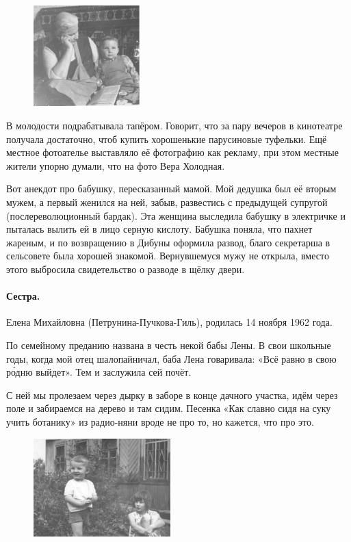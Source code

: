 \documentclass{book}
\begin{document}
\begin{figure}
\vskip-4mm
\centering
\includegraphics[width=41mm,angle=0]{pics/baba-lyusya-tosha}
\end{figure}

В молодости подрабатывала тапёром.
Говорит, что за пару вечеров в кинотеатре получала достаточно, чтоб купить хорошенькие парусиновые туфельки.
Ещё местное фотоателье выставляло её фотографию как рекламу, при этом местные жители упорно думали, что на фото Вера Холодная.

Вот анекдот про бабушку, пересказанный мамой.
Мой дедушка был её вторым мужем, а первый женился на ней, забыв, развестись с предыдущей супругой (послереволюционный бардак).
Эта женщина выследила бабушку в электричке и пыталась вылить ей в лицо серную кислоту.
Бабушка поняла, что пахнет жареным, и по возвращению в Дибуны оформила развод, благо секретарша в сельсовете была хорошей знакомой.
Вернувшемуся мужу не открыла, вместо этого выбросила свидетельство о разводе в щёлку двери.

\paragraph{Сестра.} Елена Михайловна (Петрунина-Пучкова-Гиль), родилась 14 ноября 1962 года.

По семейному преданию названа в честь некой бабы Лены.
В свои школьные годы,
когда мой отец шалопайничал,
баба Лена говаривала: «Всё равно в свою р\'{о}дню выйдет».
Тем и заслужила сей почёт.

С ней мы пролезаем через дырку в заборе в конце дачного участка, идём через поле и забираемся на дерево и там сидим.
Песенка «Как славно сидя на суку учить ботанику» из радио-няни вроде не про то, но кажется, что про это.

\begin{figure}
\vskip-0mm
\centering
\includegraphics[width=53mm,angle=0]{pics/tosha-lena-dacha}
\vskip-4mm
\end{figure}
\end{document}
